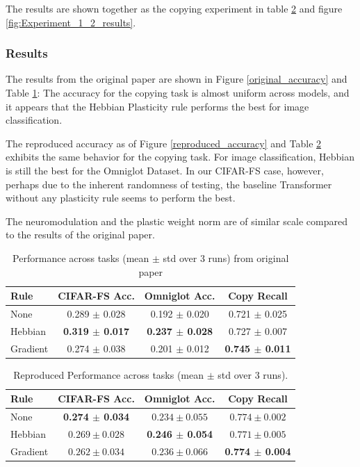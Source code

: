 \documentclass{article}
\begin{document}
The results are shown together as the copying experiment in table \ref{tab:reproduced_results} and figure \ref{fig:Experiment_1_2_results}. 

\subsubsection{Results}
The results from the original paper are shown in Figure \ref{original_accuracy} and Table \ref{tab:original_results}: The accuracy for the copying task is almost uniform across models, and it appears that the Hebbian Plasticity rule performs the best for image classification. 

The reproduced accuracy as of Figure \ref{reproduced_accuracy} and Table \ref{tab:reproduced_results} exhibits the same behavior for the copying task. For image classification, Hebbian is still the best for the Omniglot Dataset. In our CIFAR-FS case, however, perhaps due to the inherent randomness of testing, the baseline Transformer without any plasticity rule seems to perform the best.

The neuromodulation and the plastic weight norm are of similar scale compared to the results of the original paper.

\begin{table}[t]
\centering
\caption{Performance across tasks (mean $\pm$ std over 3 runs) from original paper}
\label{tab:original_results}
\begin{tabular}{l c c c}
\toprule
Rule
& CIFAR-FS Acc.  
& Omniglot Acc. 
& Copy Recall \\
\midrule
None
& 0.289 $\pm$ 0.028
& 0.192 $\pm$ 0.020
& 0.721 $\pm$ 0.025 \\

Hebbian
& \bf{0.319 $\pm$ 0.017}
& \bf{0.237 $\pm$ 0.028}
& 0.727 $\pm$ 0.007 \\

Gradient
& 0.274 $\pm$ 0.038
& 0.201 $\pm$ 0.012
& \bf{0.745 $\pm$ 0.011} \\
\bottomrule
\end{tabular}
\end{table}


\begin{table}[t]
\centering
\caption{Reproduced Performance across tasks (mean $\pm$ std over 3 runs).}
\label{tab:reproduced_results}
\begin{tabular}{l c c c}
\toprule
Rule 
& CIFAR-FS Acc.  
& Omniglot Acc. 
& Copy Recall \\
\midrule
None     
& \bf{0.274 $\pm$ 0.034}
& $0.234 \pm 0.055$
& $0.774 \pm 0.002$ \\

Hebbian  
& $0.269 \pm 0.028$
& \bf{0.246 $\pm$ 0.054}
& $0.771 \pm 0.005$ \\

Gradient 
& $0.262 \pm 0.034$
& $0.236 \pm 0.066$
& \bf{0.774 $\pm$ 0.004} \\
\bottomrule
\end{tabular}
\end{table}
\end{document}
